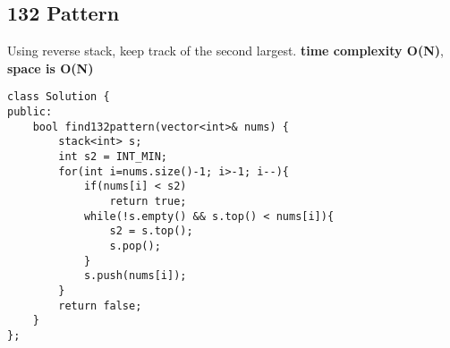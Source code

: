 \subsection{132 Pattern}
Using reverse stack, keep track of the second largest. {\color{blue}\textbf{time complexity O(N)}}, {\color{blue}\textbf{space is O(N)}}
\begin{lstlisting}
class Solution {
public:
    bool find132pattern(vector<int>& nums) {
        stack<int> s;
        int s2 = INT_MIN;
        for(int i=nums.size()-1; i>-1; i--){
            if(nums[i] < s2)
                return true;
            while(!s.empty() && s.top() < nums[i]){
                s2 = s.top();
                s.pop();
            }
            s.push(nums[i]);
        }
        return false;
    }
};
\end{lstlisting}

\subsection{}
